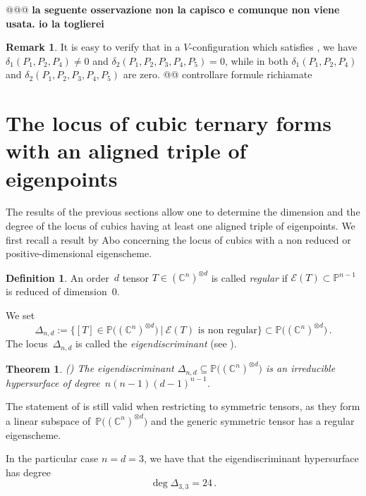 \documentclass{amsart}
\theoremstyle{plain}
\newtheorem{theorem}[lemma]{Theorem}
\theoremstyle{definition}
\newtheorem{definition}[lemma]{Definition}
\newtheorem{rmk}[lemma]{Remark}
\newcommand{\C}{\mathbb{C}}
\newcommand{\p}{\mathbb{P}}
\newcommand{\Eig}[1]{\mathcal{E}\!\left( {#1} \right)}
\begin{document}
%
@@@ \textbf{la seguente osservazione non la capisco e comunque non viene usata.
io la toglierei}
\begin{rmk}
\label{rmk:delta1_and_delta2}
It is easy to verify that in
a $V$-configuration which satisfies , we have
$\delta_1(P_1, P_2, P_4)\neq 0$ and
$\delta_2(P_1, P_2, P_3, P_4, P_5) = 0$,
while in  both $\delta_1(P_1, P_2, P_4)$ and
$\delta_2(P_1, P_2, P_3, P_4, P_5)$ are zero.
@@ controllare formule richiamate 
\end{rmk}


\section{The locus of cubic ternary forms with an aligned triple of eigenpoints}
\label{locus_one_alignment}

The results of the previous sections allow one to determine the dimension and the degree of the locus of cubics having
at least one aligned triple of eigenpoints. We first recall a result by Abo concerning the locus of cubics with a non reduced or positive-dimensional eigenscheme.

\begin{definition}
An order~$d$ tensor $T \in (\C^n)^{\otimes d}$ is called \emph{regular} if $\Eig{T}\subset \p^{n-1}$ is reduced of dimension~$0$.

We set
$$
\Delta_{n,d} := \{[T]\in \p \bigl( (\C^n)^{\otimes d} \bigr) \ | \ \Eig{T} \textrm{\ is \ non \ regular} \} \subset \p \bigl( (\C^n)^{\otimes d} \bigr) \,.
$$
The locus~$\Delta_{n,d}$ is called the \emph{eigendiscriminant} (see \cite[Definition 5.5]{Abo}).
\end{definition}

\begin{theorem} (\cite[Corollary 5.8]{Abo})
\label{theorem:eigendiscriminant}
The eigendiscriminant $\Delta_{n,d}\subseteq \p \bigl( (\C^n)^{\otimes d} \bigr)$ is an irreducible hypersurface
of degree~$n(n-1)(d-1)^{n-1}$.
\end{theorem}

The statement of  is still valid when restricting to symmetric tensors, as they form a linear subspace of~$\p \bigl( (\C^n)^{\otimes d} \bigr)$ and the generic symmetric tensor has a regular eigenscheme.

In the particular case $n=d=3$, we have that
the eigendiscriminant hypersurface has degree
%
\[
  \deg \Delta_{3,3} = 24 \,.
\]
%
\end{document}
